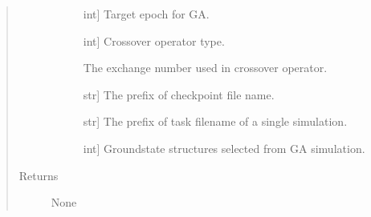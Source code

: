 \documentclass[letterpaper,10pt,english]{sphinxmanual}
\begin{document}
\begin{fulllineitems}
\begin{fulllineitems}
\begin{quote}
\begin{description}
\begin{description}
\item[{}] \leavevmode{[}int{]}
\sphinxAtStartPar
Target epoch for GA.

\item[{}] \leavevmode{[}int{]}
\sphinxAtStartPar
Crossover operator type.

\item[{}] \leavevmode
\sphinxAtStartPar
The exchange number used in crossover operator.

\item[{}] \leavevmode{[}str{]}
\sphinxAtStartPar
The prefix of checkpoint file name.

\item[{}] \leavevmode{[}str{]}
\sphinxAtStartPar
The prefix of task filename of a single simulation.

\item[{}] \leavevmode{[}int{]}
\sphinxAtStartPar
Ground\sphinxhyphen{}state structures selected from  GA simulation.

\end{description}

\item[{Returns}] \leavevmode\begin{description}
\item[{None}] \leavevmode
\end{description}

\end{description}\end{quote}

\end{fulllineitems}


\begin{fulllineitems}
\label{\detokenize{pygace:pygace.general_gace.GeneralApp.update_defect_concentration}}~
\end{fulllineitems}


\end{fulllineitems}
\end{document}
